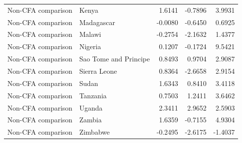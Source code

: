 \begin{table}
\begin{tabular}[t]{llrrr}
Non-CFA comparison & Kenya & 1.6141 & -0.7896 & 3.9931\\
\addlinespace
Non-CFA comparison & Madagascar & -0.0080 & -0.6450 & 0.6925\\
Non-CFA comparison & Malawi & -0.2754 & -2.1632 & 1.4377\\
Non-CFA comparison & Nigeria & 0.1207 & -0.1724 & 9.5421\\
Non-CFA comparison & Sao Tome and Principe & 0.8493 & 0.9704 & 2.9087\\
Non-CFA comparison & Sierra Leone & 0.8364 & -2.6658 & 2.9154\\
\addlinespace
Non-CFA comparison & Sudan & 1.6343 & 0.8410 & 3.4118\\
Non-CFA comparison & Tanzania & 0.7503 & 1.2411 & 3.6462\\
Non-CFA comparison & Uganda & 2.3411 & 2.9652 & 2.5903\\
Non-CFA comparison & Zambia & 1.6359 & -0.7155 & 4.9304\\
Non-CFA comparison & Zimbabwe & -0.2495 & -2.6175 & -1.4037\\
\bottomrule
\end{tabular}
\end{table}